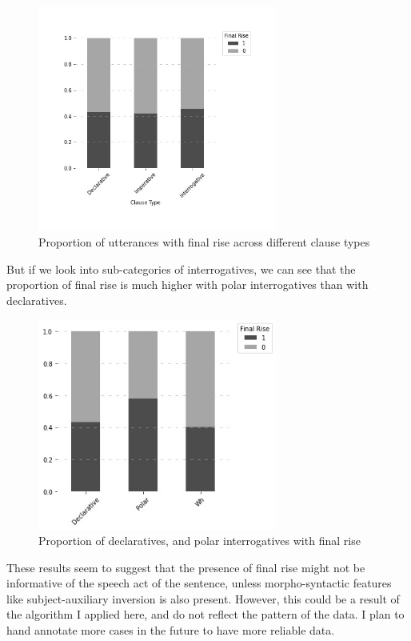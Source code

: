 \begin{figure}[H]
    \centering
    \includegraphics[width=0.7\textwidth]{figures/rise-cl.jpg}
    \caption{Proportion of utterances with final rise across different clause types}
    \label{fig:rise-cl}
\end{figure}

But if we look into sub-categories of interrogatives, we can see that the proportion of final rise is much higher with polar interrogatives than with declaratives. 
\begin{figure}[H]
    \centering
    \includegraphics[width=0.7\textwidth]{figures/pitch-polardecwh.jpg}
    \caption{Proportion of declaratives, \twh{} and polar interrogatives with final rise}
    \label{fig:rise-int}
\end{figure}

These results seem to suggest that the presence of final rise might not be informative of the speech act of the sentence, unless morpho-syntactic features like subject-auxiliary inversion is also present. However, this could be a result of the algorithm I applied here, and do not reflect the pattern of the data. I plan to hand annotate more cases in the future to have more reliable data.

